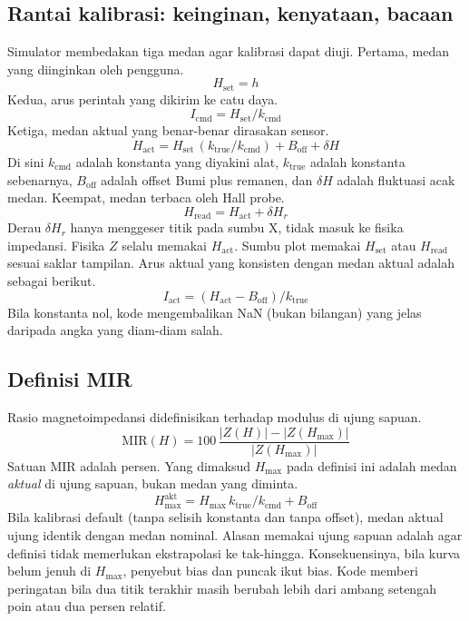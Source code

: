 \documentclass[a4paper,11pt]{article}
\begin{document}
\subsection{Rantai kalibrasi: keinginan, kenyataan, bacaan}
Simulator membedakan tiga medan agar kalibrasi dapat diuji.
Pertama, medan yang diinginkan oleh pengguna.
\begin{equation*}
H_{\mathrm{set}} = h
\end{equation*}
Kedua, arus perintah yang dikirim ke catu daya.
\begin{equation*}
I_{\mathrm{cmd}} = H_{\mathrm{set}}/k_{\mathrm{cmd}}
\end{equation*}
Ketiga, medan aktual yang benar-benar dirasakan sensor.
\begin{equation*}
H_{\mathrm{act}} = H_{\mathrm{set}}\,(k_{\mathrm{true}}/k_{\mathrm{cmd}})
+ B_{\mathrm{off}} + \delta H
\end{equation*}
Di sini $k_{\mathrm{cmd}}$ adalah konstanta yang diyakini alat,
$k_{\mathrm{true}}$ adalah konstanta sebenarnya,
$B_{\mathrm{off}}$ adalah offset Bumi plus remanen,
dan $\delta H$ adalah fluktuasi acak medan.
Keempat, medan terbaca oleh Hall probe.
\begin{equation*}
H_{\mathrm{read}} = H_{\mathrm{act}} + \delta H_{r}
\end{equation*}
Derau $\delta H_{r}$ hanya menggeser titik pada sumbu X,
tidak masuk ke fisika impedansi.
Fisika $Z$ selalu memakai $H_{\mathrm{act}}$.
Sumbu plot memakai $H_{\mathrm{set}}$ atau $H_{\mathrm{read}}$
sesuai saklar tampilan.
Arus aktual yang konsisten dengan medan aktual adalah sebagai berikut.
\begin{equation*}
I_{\mathrm{act}} = (H_{\mathrm{act}}-B_{\mathrm{off}})/k_{\mathrm{true}}
\end{equation*}
Bila konstanta nol, kode mengembalikan NaN (bukan bilangan) yang jelas
daripada angka yang diam-diam salah.

\subsection{Definisi MIR}
Rasio magnetoimpedansi didefinisikan terhadap modulus di ujung sapuan.
\begin{equation}
\mathrm{MIR}(H) = 100\,\frac{|Z(H)|-|Z(H_{\max})|}{|Z(H_{\max})|}
\label{eq:2}
\end{equation}
Satuan MIR adalah persen.
Yang dimaksud $H_{\max}$ pada definisi ini adalah medan \emph{aktual}
di ujung sapuan, bukan medan yang diminta.
\begin{equation*}
H_{\max}^{\mathrm{akt}} = H_{\max}\,k_{\mathrm{true}}/k_{\mathrm{cmd}}
+ B_{\mathrm{off}}
\end{equation*}
Bila kalibrasi default (tanpa selisih konstanta dan tanpa offset),
medan aktual ujung identik dengan medan nominal.
Alasan memakai ujung sapuan adalah agar definisi tidak memerlukan
ekstrapolasi ke tak-hingga.
Konsekuensinya, bila kurva belum jenuh di $H_{\max}$,
penyebut bias dan puncak ikut bias.
Kode memberi peringatan bila dua titik terakhir masih berubah lebih dari
ambang setengah poin atau dua persen relatif.
\end{document}
